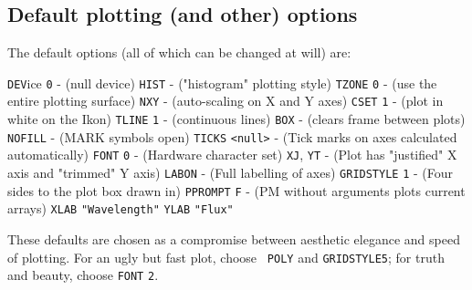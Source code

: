 \documentclass[twoside,11pt]{article}
\newcommand{\htmlref}[2]{#1}
\renewcommand{\_}{\texttt{\symbol{95}}}
\begin{document}
\subsection {Default plotting (and other) options}

The default options (all of which can be changed at will) are:

\htmlref{{\tt{DEV}}}{COM:DEV}ice  {\tt{0}}  - (null device) \newline
\htmlref{{\tt{HIST}}}{COM:HIST}  - ("histogram" plotting style) \newline
\htmlref{{\tt{TZONE}}}{COM:TZONE}  {\tt{0}}  - (use the entire plotting surface) \newline
\htmlref{{\tt{NXY}}}{COM:NXY}  - (auto-scaling on X and Y axes) \newline
\htmlref{{\tt{CSET}}}{COM:CSET}  {\tt{1}}  - (plot in white on the Ikon) \newline
\htmlref{{\tt{TLINE}}}{COM:TLINE}  {\tt{1}}  - (continuous lines) \newline
\htmlref{{\tt{BOX}}}{COM:BOX}  - (clears frame between plots) \newline
\htmlref{{\tt{NOFILL}}}{COM:NOFILL}  - (MARK symbols open) \newline
\htmlref{{\tt{TICKS}}}{COM:TICKS}  {\tt{<null>}}  - (Tick marks on axes calculated automatically) \newline
\htmlref{{\tt{FONT}}}{COM:FONT}  {\tt{0}}  - (Hardware character set) \newline
\htmlref{{\tt{XJ}}}{COM:XJ},  \htmlref{{\tt{YT}}}{COM:YT}  - (Plot has "justified" X axis and "trimmed" Y axis) \newline
\htmlref{{\tt{LABON}}}{COM:LABON}  - (Full labelling of axes) \newline
\htmlref{{\tt{GRIDSTYLE}}}{COM:GRIDSTYLE}  {\tt{1}}  - (Four sides to the plot box drawn in) \newline
\htmlref{{\tt{PPROMPT}}}{COM:PPROMPT}  {\tt{F}}  - (PM without arguments plots current arrays) \newline
\htmlref{{\tt{XLAB}}}{COM:XLAB}  {\tt{"Wavelength"}}  \newline
\htmlref{{\tt{YLAB}}}{COM:YLAB}  {\tt{"Flux"}}  \newline

These defaults are chosen as a compromise between aesthetic elegance and
speed of plotting. For an ugly but fast plot, choose \htmlref{{\tt
POLY}}{COM:POLY} and \htmlref{{\tt{GRIDSTYLE}}}{COM:GRIDSTYLE}{\tt  5}; for
truth and beauty, choose \htmlref{{\tt{FONT}}}{COM:FONT}  {\tt{2}}. 
\end{document}
